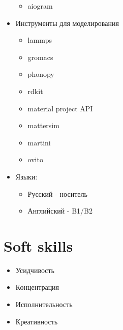 \documentclass[a4paper, 12pt]{article}
\begin{document}
\begin{itemize}
\begin{itemize}
        \item aiogram
    \end{itemize}
    \item Инструменты для моделирования
    \begin{itemize}
        \item lammps
        \item gromacs
        \item phonopy
        \item rdkit
        \item material project API
        \item mattersim
        \item martini
        \item ovito
    \end{itemize}
    \item Языки:
    \begin{itemize}
        \item Русский    - носитель
        \item Английский - B1/B2
    \end{itemize}
\end{itemize}

\section{Soft skills}
\begin{itemize}
    \item Усидчивость
    \item Концентрация
    \item Исполнительность
    \item Креативность
\end{itemize}
\end{document}
